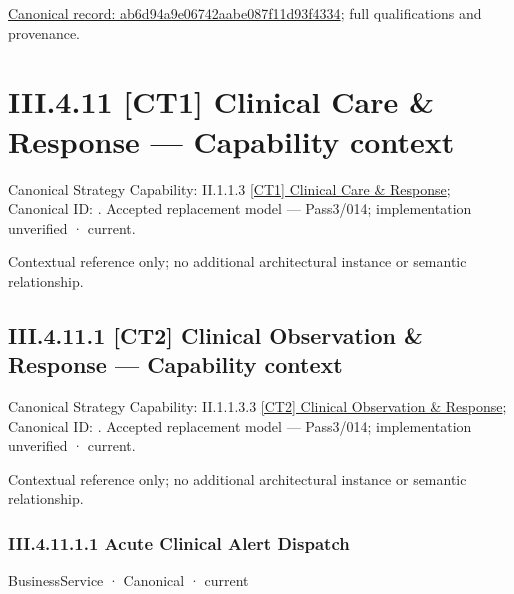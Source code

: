 {\footnotesize \href{../../../../../../../../continuum/business/business-function/ab6d94a9e06742aabe087f11d93f4334.md}{Canonical record: ab6d94a9e06742aabe087f11d93f4334}; full qualifications and provenance.}\par
\section*{III.4.11 [CT1] Clinical Care \& Response — Capability context}
\label{navigation:III.4.11}

{\small Canonical Strategy Capability: II.1.1.3 \hyperref[element:0962afc8439c4e1898a7e2ae3f4186a4]{[CT1] Clinical Care \& Response}; Canonical ID: \texttt{}. Accepted replacement model — Pass3/014; implementation unverified · current.}\par
Contextual reference only; no additional architectural instance or semantic relationship.\par
\subsection*{III.4.11.1 [CT2] Clinical Observation \& Response — Capability context}
\label{navigation:III.4.11.1}

{\small Canonical Strategy Capability: II.1.1.3.3 \hyperref[element:b6794d4b6ac84b9d82613c41ad4650a2]{[CT2] Clinical Observation \& Response}; Canonical ID: \texttt{}. Accepted replacement model — Pass3/014; implementation unverified · current.}\par
Contextual reference only; no additional architectural instance or semantic relationship.\par
\subsubsection*{III.4.11.1.1 Acute Clinical Alert Dispatch}
\label{navigation:III.4.11.1.1}

\label{element:34d7f0bfff8f470bb97c00582f5e8a1d}
{\small BusinessService · Canonical · current}\par

